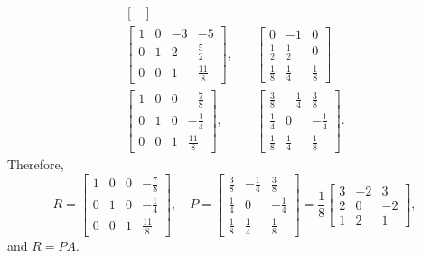 \begin{solution}
\begin{align*}
\begin{bmatrix}
    \end{bmatrix} \\
    \begin{bmatrix}
      1 & 0 & -3 & -5 \\[3pt]
      0 & 1 & 2 & \frac52 \\[3pt]
      0 & 0 & 1 & \frac{11}8
    \end{bmatrix},
    &\quad
    \begin{bmatrix}
      0 & -1 & 0 \\[3pt]
      \frac12 & \frac12 & 0 \\[3pt]
      \frac18 & \frac14 & \frac18
    \end{bmatrix} \\
    \begin{bmatrix}
      1 & 0 & 0 & -\frac78 \\[3pt]
      0 & 1 & 0 & -\frac14 \\[3pt]
      0 & 0 & 1 & \frac{11}8
    \end{bmatrix},
    &\quad
    \begin{bmatrix}
      \frac38 & -\frac14 & \frac38 \\[3pt]
      \frac14 & 0 & -\frac14 \\[3pt]
      \frac18 & \frac14 & \frac18
    \end{bmatrix}.
  \end{align*}
  Therefore,
  \begin{equation*}
    R =
    \begin{bmatrix}
      1 & 0 & 0 & -\frac78 \\[3pt]
      0 & 1 & 0 & -\frac14 \\[3pt]
      0 & 0 & 1 & \frac{11}8
    \end{bmatrix},
    \quad
    P =
    \begin{bmatrix}
      \frac38 & -\frac14 & \frac38 \\[3pt]
      \frac14 & 0 & -\frac14 \\[3pt]
      \frac18 & \frac14 & \frac18
    \end{bmatrix}
    =
    \frac18
    \begin{bmatrix}
      3 & -2 & 3 \\
      2 & 0 & -2 \\
      1 & 2 & 1
    \end{bmatrix},
  \end{equation*}
  and $R = PA$.
\end{solution}
